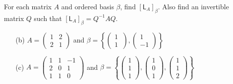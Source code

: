 For each matrix $A$ and ordered basis $\beta$, find
$[\mathsf{L}_A]_\beta$. Also find an invertible matrix $Q$ such that
$[\mathsf{L}_A]_\beta = Q^{-1}AQ$.
\begin{enumerate}[(a)]
\item[(b)] $A = \begin{pmatrix}1&2\\2&1
  \end{pmatrix}$ and $\beta =\left\{\begin{pmatrix}1\\1\
    \end{pmatrix},\begin{pmatrix}1\\-1
    \end{pmatrix}
  \right\}$

  \item[(c)] $A = \begin{pmatrix}1&1&-1\\2&0&1\\1&1&0
    \end{pmatrix}$
    and 
$\beta = \left\{\begin{pmatrix}1\\1\\1
    \end{pmatrix}, \begin{pmatrix}1\\0\\1
    \end{pmatrix},\begin{pmatrix}1\\1\\2
    \end{pmatrix}\right\}$
\end{enumerate}
